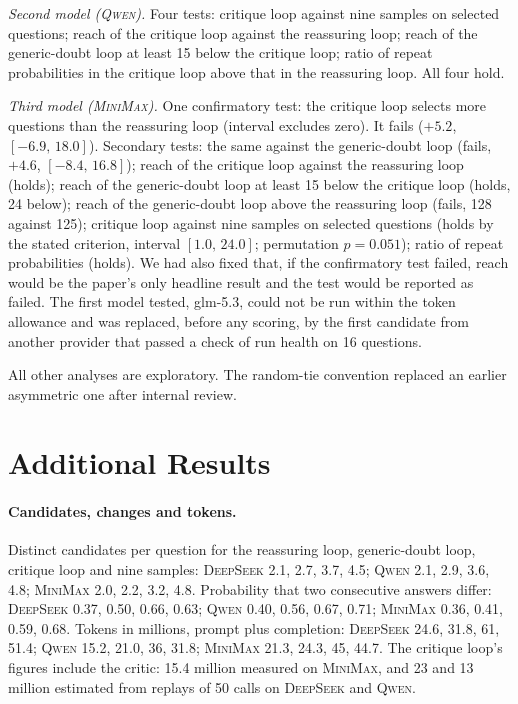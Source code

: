 \documentclass[11pt]{article}
\newcommand{\ds}{\textsc{DeepSeek}}
\newcommand{\qw}{\textsc{Qwen}}
\newcommand{\mm}{\textsc{MiniMax}}
\newcommand{\ci}[2]{$[#1,\,#2]$}
\begin{document}
\emph{Second model (\qw).}
Four tests: critique loop against nine samples on selected questions; reach of the critique loop against the reassuring loop; reach of the generic-doubt loop at least 15 below the critique loop; ratio of repeat probabilities in the critique loop above that in the reassuring loop.
All four hold.

\emph{Third model (\mm).}
One confirmatory test: the critique loop selects more questions than the reassuring loop (interval excludes zero).
It fails ($+5.2$, \ci{-6.9}{18.0}).
Secondary tests: the same against the generic-doubt loop (fails, $+4.6$, \ci{-8.4}{16.8}); reach of the critique loop against the reassuring loop (holds); reach of the generic-doubt loop at least 15 below the critique loop (holds, 24 below); reach of the generic-doubt loop above the reassuring loop (fails, 128 against 125); critique loop against nine samples on selected questions (holds by the stated criterion, interval \ci{1.0}{24.0}; permutation $p=0.051$); ratio of repeat probabilities (holds).
We had also fixed that, if the confirmatory test failed, reach would be the paper's only headline result and the test would be reported as failed.
The first model tested, glm-5.3, could not be run within the token allowance and was replaced, before any scoring, by the first candidate from another provider that passed a check of run health on 16 questions.

All other analyses are exploratory.
The random-tie convention replaced an earlier asymmetric one after internal review.

\section{Additional Results}
\label{app:more}

\paragraph{Candidates, changes and tokens.}
Distinct candidates per question for the reassuring loop, generic-doubt loop, critique loop and nine samples: \ds{} 2.1, 2.7, 3.7, 4.5; \qw{} 2.1, 2.9, 3.6, 4.8; \mm{} 2.0, 2.2, 3.2, 4.8.
Probability that two consecutive answers differ: \ds{} 0.37, 0.50, 0.66, 0.63; \qw{} 0.40, 0.56, 0.67, 0.71; \mm{} 0.36, 0.41, 0.59, 0.68.
Tokens in millions, prompt plus completion: \ds{} 24.6, 31.8, 61, 51.4; \qw{} 15.2, 21.0, 36, 31.8; \mm{} 21.3, 24.3, 45, 44.7.
The critique loop's figures include the critic: 15.4 million measured on \mm, and 23 and 13 million estimated from replays of 50 calls on \ds{} and \qw.
\end{document}
